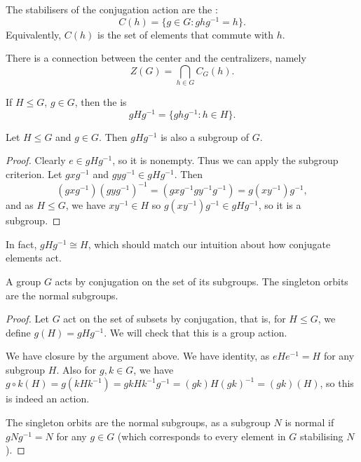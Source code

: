 \documentclass[a4]{scrreprt}
\begin{document}
\begin{definition}[centralizers]
	The stabilisers of the conjugation action are the :
	$$
C(h) = \{ g \in G : ghg^{-1} = h \}.
	$$
	Equivalently, $C(h)$ is the set of elements that commute with $h$.
\end{definition}

There is a connection between the center and the centralizers, namely
$$
Z(G) = \bigcap_{h \in G} C_G(h).
$$

\begin{definition}
	If $H \leq G$, $g \in G$, then the  is
	$$
	gHg^{-1} = \{g hg^{-1} : h \in H\}.
	$$
\end{definition}
\begin{proposition}
	Let $H \leq G$ and $g \in G$. Then $gHg^{-1}$ is also a subgroup of $G$.
\end{proposition}
\begin{proof}[Proof]
	Clearly $e \in gHg^{-1}$, so it is nonempty. Thus we can apply the subgroup criterion. 
	Let $gxg^{-1}$ and $gyg^{-1} \in gHg^{-1}$. Then
	$$
	(gxg^{-1})(gyg^{-1})^{-1} = (gxg^{-1}gy^{-1}g^{-1}) = g(xy^{-1})g^{-1},
	$$
	and as $H \leq G$, we have $xy^{-1} \in H$ so $g(xy^{-1})g^{-1} \in gHg^{-1}$, so it is a subgroup.
\end{proof}
In fact, $gHg^{-1} \cong H$, which should match our intuition about how conjugate elements act.



\begin{proposition}
	A group $G$ acts by conjugation on the set of its subgroups. The singleton orbits are the normal subgroups.
\end{proposition}
\begin{proof}
	Let $G$ act on the set of subsets by conjugation, that is, for $H \leq G$, we define $g(H) = gHg^{-1}$. We will check that this is a group action.
	
	We have closure by the argument above. We have identity, as $eHe^{-1} = H$ for any subgroup $H$. Also for $g, k \in G$, we have $g\circ k (H) = g(k H k^{-1}) = gk H k^{-1}g^{-1} = (gk)H(gk)^{-1} = (gk)(H)$, so this is indeed an action.

	The singleton orbits are the normal subgroups, as a subgroup $N$ is normal if $g N g^{-1} = N$ for any $g \in G$ (which corresponds to every element in $G$ stabilising $N$).
\end{proof}
\end{document}
